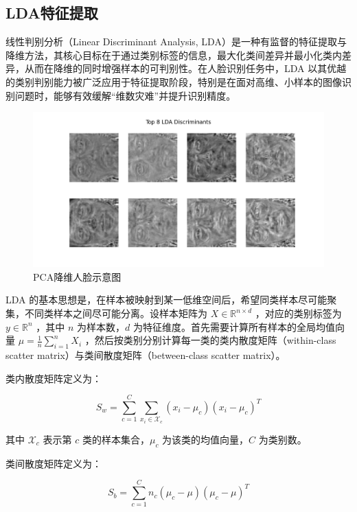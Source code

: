 \documentclass[a4paper, utf8]{ctexart}
\begin{document}
	\subsection{LDA特征提取}
	
	线性判别分析（Linear Discriminant Analysis, LDA）是一种有监督的特征提取与降维方法，其核心目标在于通过类别标签的信息，最大化类间差异并最小化类内差异，从而在降维的同时增强样本的可判别性。在人脸识别任务中，LDA 以其优越的类别判别能力被广泛应用于特征提取阶段，特别是在面对高维、小样本的图像识别问题时，能够有效缓解“维数灾难”并提升识别精度\cite{ml1, ml2, ml3, lda}。
	
	\begin{figure}[htbp]
		\centering
		\includegraphics[width=.8\textwidth]{./figure/LDAeigenfaces.png}
		\caption{PCA降维人脸示意图}
	\end{figure}
	
	LDA 的基本思想是，在样本被映射到某一低维空间后，希望同类样本尽可能聚集，不同类样本之间尽可能分离。设样本矩阵为 $X \in \mathbb{R}^{n \times d}$ ，对应的类别标签为 $y \in \mathbb{R}^n$ ，其中 $n$ 为样本数，$d$ 为特征维度。首先需要计算所有样本的全局均值向量 $\mu = \frac{1}{n} \sum_{i=1}^n X_i$ ，然后按类别分别计算每一类的类内散度矩阵（within-class scatter matrix）与类间散度矩阵（between-class scatter matrix）。
	
	类内散度矩阵定义为：
	
	\vspace{-.5em}
	\begin{equation}
		S_w = \sum_{c=1}^C \sum_{x_i \in \mathcal{X}_c} (x_i - \mu_c)(x_i - \mu_c)^T
	\end{equation}
	 
	其中 $\mathcal{X}_c$ 表示第 $c$ 类的样本集合，$\mu_c$ 为该类的均值向量，$C$ 为类别数。
	
	类间散度矩阵定义为：
	
	\vspace{-.5em}
	\begin{equation}
		S_b = \sum_{c=1}^C n_c(\mu_c - \mu)(\mu_c - \mu)^T
	\end{equation}
	 
\end{document}
